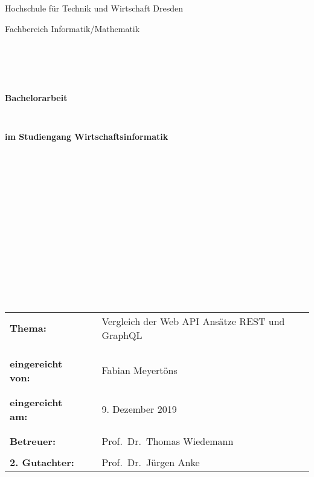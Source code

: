\thispagestyle{empty}
\begin{center}
\Large{Hochschule für Technik und Wirtschaft Dresden}\\
\end{center}


\begin{center}
\Large{Fachbereich Informatik/Mathematik}
\end{center}
\begin{verbatim}





\end{verbatim}
\begin{center}
\textbf{\LARGE{Bachelorarbeit}}
\end{center}
\begin{verbatim}


\end{verbatim}
\begin{center}
\textbf{im Studiengang Wirtschaftsinformatik}
\end{center}
\begin{verbatim}
















\end{verbatim}

\begin{flushleft}
\begin{tabular}{lll}
\textbf{Thema:} & & Vergleich der Web API Ansätze REST und GraphQL\\
& & \\
& & \\
& & \\
\textbf{eingereicht von:} & & Fabian Meyertöns\\
& & \\
& & \\
\textbf{eingereicht am:} & & 9. Dezember 2019 \\
& & \\
& & \\
\textbf{Betreuer:} & & Prof.\ Dr.\ Thomas Wiedemann\\
& & \\
\textbf{2. Gutachter:} & & Prof.\ Dr.\ Jürgen Anke
\end{tabular}
\end{flushleft}